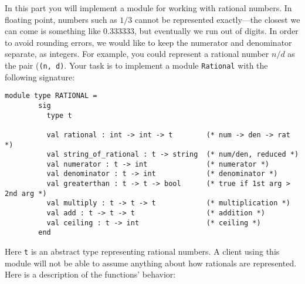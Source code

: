 \documentclass[11pt]{article}
\begin{document}
    In this part you will implement a module for working with rational
  numbers.  In floating point, numbers such as $1/3$ cannot be represented
  exactly---the closest we can come is something like 0.333333, but
  eventually we run out of digits.  In order to avoid rounding errors, we
  would like to keep the numerator and denominator separate, as integers.
  For example, you could represent a rational number $n/d$ as the pair
  (\texttt{(n, d)}.  Your task is to implement a module \texttt{Rational}
  with the following signature:

    \vspace{-1mm}

    \begin{center}

      \begin{BVerbatim}[gobble=6,baselinestretch=.925]
      module type RATIONAL =
        sig
          type t

          val rational : int -> int -> t        (* num -> den -> rat *)
          val string_of_rational : t -> string  (* num/den, reduced *)
          val numerator : t -> int              (* numerator *)
          val denominator : t -> int            (* denominator *)
          val greaterthan : t -> t -> bool      (* true if 1st arg > 2nd arg *)
          val multiply : t -> t -> t            (* multiplication *)
          val add : t -> t -> t                 (* addition *)
          val ceiling : t -> int                (* ceiling *)
        end
      \end{BVerbatim}

    \end{center}

    \vspace{-1mm}

    Here \texttt{t} is an abstract type representing rational numbers.  A
  client using this module will not be able to assume anything about how
  rationals are represented.  Here is a description of the functions'
  behavior:

    \vspace{-2.5mm}
\end{document}

